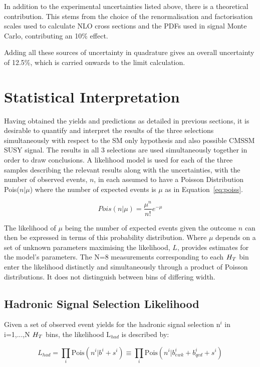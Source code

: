 In addition to the experimental uncertainties listed above, there is a theoretical contribution. This stems from the choice of the renormalisation and factorisation scales used to calculate NLO cross sections and the PDFs used in signal Monte Carlo,  contributing an 10\% effect. 

Adding all these sources of uncertainty in quadrature gives an overall uncertainty of 12.5\%, which is carried onwards to the limit calculation. 

\section{Statistical Interpretation}
\label{sec:fit}
Having obtained the yields and predictions as detailed in previous sections, it is desirable to quantify and interpret the results of the three selections simultaneously with respect to the SM only hypothesis and also possible CMSSM SUSY signal. The results in all 3 selections are used simultaneously together in order to draw conclusions. A likelihood model is used for each of the three samples describing the relevant results along with the uncertainties, with the number of observed events, $n$, in each assumed to have a Poisson Distribution Pois($n | \mu$) where the number of expected events is $\mu$ as in Equation~\ref{eq:poiss}.

\begin{equation}
Pois(n | \mu)  = \frac{\mu^{n}}{n!} e^{-\mu}
\label{eq:poiss} 
\end{equation}

The likelihood of $\mu$ being the number of expected events given the outcome $n$ can then be expressed in terms of this probability distribution. Where $\mu$ depends on a set of unknown parameters maximising the likelihood, $L$, provides estimates for the model's parameters. The N=8 measurements corresponding to each $H_{T}$ bin enter the likelihood distinctly and simultaneously through a product of Poisson distributions. It does not distinguish between bins of differing width. 

\subsection{Hadronic Signal Selection Likelihood}

Given a set of observed event yields for the hadronic signal selection n$^{i}$ in i=1,...,N $ H_{T}$ bins, the likelihood L$_{had}$ is described by:

\begin{equation}
L_{had} = \prod_{i} \textrm{Pois}(n^{i}|b^{i} + s^{i}) \equiv \prod_{i} \textrm{Pois}(n^{i} | b^{i}_{ewk} + b^{i}_{qcd} + s^{i})
\label{eq:Lhad1}
\end{equation}

